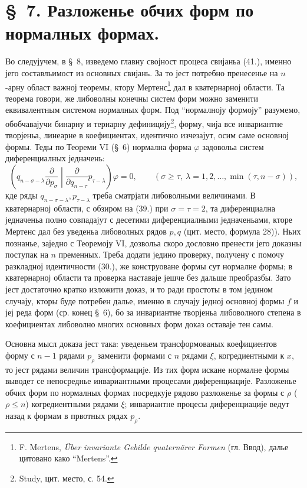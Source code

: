 ﻿\documentclass[11pt]{article}
\begin{document}
\section*{\S\ 7. Разложенье обчих форм по нормалных формах.}

Во следујучем, в \S\ 8, изведемо главну својност процеса свијаньа (41.), именно јего составльимост из основных свијань. За то јест потребно пренесенье на $n$-арну област важној теоремы, ктору Мертенс\footnote{F. Mertens, \emph{\"Uber invariante Gebilde quatern\"arer Formen} (гл. Ввод), далье цитовано како ``Mertens''.} дал в кватернарној области. Та теорема говори, же либоволны конечны систем форм можно заменити еквивалентным системом нормалных форм. Под ``нормалноју формоју'' разумемо, обобчавајучи бинарну и тернарну дефиницију\footnote{Study, цит. место, с. 54.}, форму, чија все инвариантне творјеньа, линеарне в коефициентах, идентично изчезајут, осим саме основној формы. Теды по Теореми VI (\S\ 6) нормална форма $\varphi$ задовольа систем диференциалных једначень:
\begin{equation}
 \left(q_{n-\sigma-\lambda}\frac{\partial}{\partial p_\sigma}\middle|\frac{\partial}{\partial q_{n-\tau}}p_{\tau-\lambda}\right)\varphi=0,
 \qquad(\sigma\ge\tau,\ \lambda=1,2,\ldots,\min(\tau,n-\sigma)),
\tag{46}
\end{equation}
кде ряды $q_{n-\sigma-\lambda},p_{\tau-\lambda}$ треба сматрјати либоволными величинами. В кватернарној области, с обзиром на (39.) при $\sigma=\tau=2$, та диференциална једначеньа полно совпадајут с десетими диференциалными једначеньами, кторе Мертенс дал без уведеньа либоволных рядов $p,q$ (цит. место, формула 28)). Ньих познанье, заједно с Теоремоју VI, дозвольа скоро дословно пренести јего доказны поступак на $n$ пременных. Треба додати једино проверку, получену с помочу разкладној идентичности (30.), же конструоване формы сут нормалне формы; в кватернарној области та проверка наставаје јешче без дальше преобразбы. Зато јест достаточно кратко изложити доказ, и то ради простоты в том једином случају, кторы буде потребен далье, именно в случају једној основној формы $f$ и јеј реда форм (ср. конец \S\ 6), бо за инвариантне творјеньа либоволного степена в коефициентах либоволно многих основных форм доказ оставаје тен самы.

Основна мысл доказа јест така: уведеньем трансформованых коефициентов форму с $n-1$ рядами $p_\rho$ заменити формами с $n$ рядами $\xi$, когредиентными к $x$, то јест рядами величин трансформације. Из тих форм искане нормалне формы выводет се непосреднье инвариантными процесами диференциације. Разложенье обчих форм по нормалных формах посредкује рядово разложенье за формы с $\rho$ ($\rho\le n$) когредиентными рядами $\xi$; инвариантне процесы диференциације ведут назад к формам в првотных рядах $p_\rho$.
\end{document}
